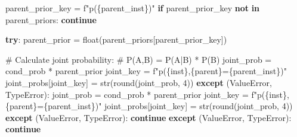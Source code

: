 \documentclass[
  11pt,
  letterpaper,
]{book}
\newenvironment{Shaded}{\begin{snugshade}}{\end{snugshade}}
\newcommand{\BuiltInTok}[1]{\textcolor[rgb]{0.00,0.23,0.31}{#1}}
\newcommand{\CommentTok}[1]{\textcolor[rgb]{0.37,0.37,0.37}{#1}}
\newcommand{\ControlFlowTok}[1]{\textcolor[rgb]{0.00,0.23,0.31}{\textbf{#1}}}
\newcommand{\DecValTok}[1]{\textcolor[rgb]{0.68,0.00,0.00}{#1}}
\newcommand{\KeywordTok}[1]{\textcolor[rgb]{0.00,0.23,0.31}{\textbf{#1}}}
\newcommand{\NormalTok}[1]{\textcolor[rgb]{0.00,0.23,0.31}{#1}}
\newcommand{\OperatorTok}[1]{\textcolor[rgb]{0.37,0.37,0.37}{#1}}
\newcommand{\PreprocessorTok}[1]{\textcolor[rgb]{0.68,0.00,0.00}{#1}}
\newcommand{\SpecialCharTok}[1]{\textcolor[rgb]{0.37,0.37,0.37}{#1}}
\newcommand{\SpecialStringTok}[1]{\textcolor[rgb]{0.13,0.47,0.30}{#1}}
\begin{document}
\begin{Shaded}
\begin{Highlighting}[]
\NormalTok{                            parent\_prior\_key }\OperatorTok{=} \SpecialStringTok{f"p(}\SpecialCharTok{\{}\NormalTok{parent\_inst}\SpecialCharTok{\}}\SpecialStringTok{)"}
                            \ControlFlowTok{if}\NormalTok{ parent\_prior\_key }\KeywordTok{not} \KeywordTok{in}\NormalTok{ parent\_priors:}
                                \ControlFlowTok{continue}

                            \ControlFlowTok{try}\NormalTok{:}
\NormalTok{                                parent\_prior }\OperatorTok{=} \BuiltInTok{float}\NormalTok{(parent\_priors[parent\_prior\_key])}

                                \CommentTok{\# Calculate joint probability:}
                                \CommentTok{\# P(A,B) = P(A|B) * P(B)}
\NormalTok{                                joint\_prob }\OperatorTok{=}\NormalTok{ cond\_prob }\OperatorTok{*}\NormalTok{ parent\_prior}
\NormalTok{                                joint\_key }\OperatorTok{=} \SpecialStringTok{f"p(}\SpecialCharTok{\{}\NormalTok{inst}\SpecialCharTok{\}}\SpecialStringTok{,}\SpecialCharTok{\{}\NormalTok{parent}\SpecialCharTok{\}}\SpecialStringTok{=}\SpecialCharTok{\{}\NormalTok{parent\_inst}\SpecialCharTok{\}}\SpecialStringTok{)"}
\NormalTok{                                joint\_probs[joint\_key] }\OperatorTok{=} \BuiltInTok{str}\NormalTok{(}\BuiltInTok{round}\NormalTok{(joint\_prob, }\DecValTok{4}\NormalTok{))}
                            \ControlFlowTok{except}\NormalTok{ (}\PreprocessorTok{ValueError}\NormalTok{, }\PreprocessorTok{TypeError}\NormalTok{):}
\NormalTok{                                joint\_prob }\OperatorTok{=}\NormalTok{ cond\_prob }\OperatorTok{*}\NormalTok{ parent\_prior}
\NormalTok{                                joint\_key }\OperatorTok{=} \SpecialStringTok{f"p(}\SpecialCharTok{\{}\NormalTok{inst}\SpecialCharTok{\}}\SpecialStringTok{,}\SpecialCharTok{\{}\NormalTok{parent}\SpecialCharTok{\}}\SpecialStringTok{=}\SpecialCharTok{\{}\NormalTok{parent\_inst}\SpecialCharTok{\}}\SpecialStringTok{)"}
\NormalTok{                                joint\_probs[joint\_key] }\OperatorTok{=} \BuiltInTok{str}\NormalTok{(}\BuiltInTok{round}\NormalTok{(joint\_prob, }\DecValTok{4}\NormalTok{))}
                            \ControlFlowTok{except}\NormalTok{ (}\PreprocessorTok{ValueError}\NormalTok{, }\PreprocessorTok{TypeError}\NormalTok{):}
                                \ControlFlowTok{continue}
                        \ControlFlowTok{except}\NormalTok{ (}\PreprocessorTok{ValueError}\NormalTok{, }\PreprocessorTok{TypeError}\NormalTok{):}
                            \ControlFlowTok{continue}


\end{Highlighting}
\end{Shaded}
\end{document}
